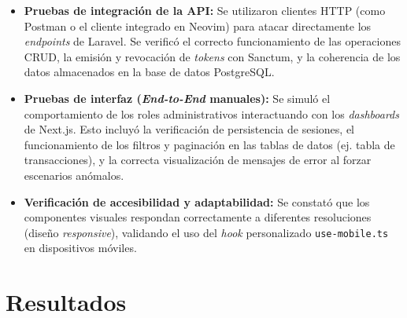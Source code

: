 \documentclass[12pt,letterpaper]{report}
\begin{document}
	\begin{itemize}
		\item \textbf{Pruebas de integración de la API:} Se utilizaron clientes HTTP (como Postman o el cliente integrado en Neovim) para atacar directamente los \textit{end\-points} de Laravel. Se verificó el correcto funcionamiento de las operaciones CRUD, la emisión y revocación de \textit{tokens} con Sanctum, y la coherencia de los datos almacenados en la base de datos PostgreSQL.
		
		
		\item \textbf{Pruebas de interfaz (\textit{End-to-End} manuales):} Se simuló el comportamiento de los roles administrativos interactuando con los \textit{dash\-boards} de Next.js. Esto incluyó la verificación de persistencia de sesiones, el funcionamiento de los filtros y paginación en las tablas de datos (ej. tabla de transacciones), y la correcta visualización de mensajes de error al forzar escenarios anómalos.
		
		
		\item \textbf{Verificación de accesibilidad y adaptabilidad:} Se constató que los componentes visuales respondan correctamente a diferentes resoluciones (diseño \textit{responsive}), validando el uso del \textit{hook} personalizado \texttt{use-mobile.ts} en dispositivos móviles.
		
	\end{itemize}
	
	\section{Resultados}
	
\end{document}
